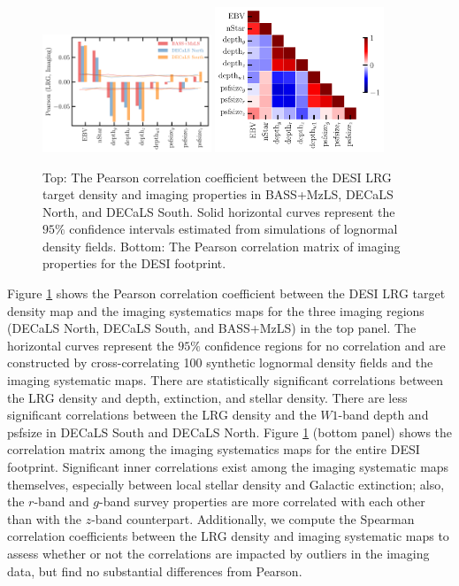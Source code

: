 \begin{figure}
\centering
 \includegraphics[width=0.45\textwidth]{figures/pcc.pdf} 
 \includegraphics[width=0.45\textwidth]{figures/pccx.pdf}  
 \caption{Top: The Pearson correlation coefficient between the DESI LRG target density and imaging properties in BASS+MzLS, DECaLS North, and DECaLS South. Solid horizontal curves represent the $95\%$ confidence intervals estimated from simulations of lognormal density fields. Bottom: The Pearson correlation matrix of imaging properties for the DESI footprint.}
 \label{fig:pcc}
\end{figure}

Figure \ref{fig:pcc} shows the Pearson correlation coefficient between the DESI LRG target density map and the imaging systematics maps for the three imaging regions (DECaLS North, DECaLS South, and BASS+MzLS) in the top panel. The horizontal curves represent the $95\%$ confidence regions for no correlation and are constructed by cross-correlating 100 synthetic lognormal density fields and the imaging systematic maps. There are statistically significant correlations between the LRG density and depth, extinction, and stellar density. There are less significant correlations between the LRG density and the $W1$-band depth and psfsize in DECaLS South and DECaLS North. Figure \ref{fig:pcc} (bottom panel) shows the correlation matrix among the imaging systematics maps for the entire DESI footprint. Significant inner correlations exist among the imaging systematic maps themselves, especially between local stellar density and Galactic extinction; also, the $r$-band and $g$-band survey properties are more correlated with each other than with the $z$-band counterpart. Additionally, we compute the Spearman correlation coefficients between the LRG density and imaging systematic maps to assess whether or not the correlations are impacted by outliers in the imaging data, but find no substantial differences from Pearson.

